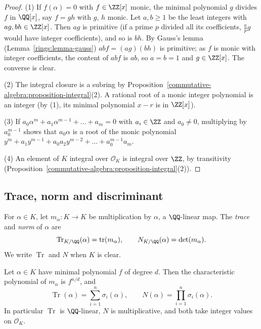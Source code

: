 \begin{proof}
(1) If $f(\alpha) = 0$ with $f \in \ZZ[x]$ monic, the minimal polynomial $g$ divides $f$ in $\QQ[x]$, say $f = gh$ with $g$, $h$ monic. Let $a, b \geq 1$ be the least integers with $ag, bh \in \ZZ[x]$. Then
$ag$ is primitive (if a prime $p$ divided all its coefficients, $\frac ap g$ would have integer coefficients), and so is $bh$. By Gauss's lemma (Lemma~\ref{rings:lemma-gauss}) $abf = (ag)(bh)$ is
primitive; as $f$ is monic with integer coefficients, the content of $abf$ is $ab$, so $a = b = 1$ and $g \in \ZZ[x]$. The converse is clear.

(2) The integral closure is a subring by Proposition~\ref{commutative-algebra:proposition-integral}(2). A rational root of a monic integer polynomial is an integer (by (1), its minimal polynomial
$x - r$ is in $\ZZ[x]$).

(3) If $a_0\alpha^m + a_1\alpha^{m-1} + \dots + a_m = 0$ with $a_i \in \ZZ$ and $a_0 \neq 0$, multiplying by $a_0^{m-1}$ shows that $a_0\alpha$ is a root of the monic polynomial
$y^m + a_1y^{m-1} + a_0a_2y^{m-2} + \dots + a_0^{m-1}a_m$.

(4) An element of $K$ integral over $\mathcal{O}_K$ is integral over $\ZZ$, by transitivity (Proposition~\ref{commutative-algebra:proposition-integral}(2)).
\end{proof}

\subsection{Trace, norm and discriminant}\label{algebraic-number-theory:subsection-trace-norm}

\begin{definition}\label{algebraic-number-theory:definition-trace-norm}
For $\alpha \in K$, let $m_\alpha \colon K \to K$ be multiplication by $\alpha$, a $\QQ$-linear map. The \emph{trace} and \emph{norm} of $\alpha$ are
\[
\operatorname{Tr}_{K/\QQ}(\alpha) = \operatorname{tr}(m_\alpha), \qquad N_{K/\QQ}(\alpha) = \det(m_\alpha).
\]
We write $\operatorname{Tr}$ and $N$ when $K$ is clear.
\end{definition}

\begin{proposition}\label{algebraic-number-theory:proposition-trace-norm}
Let $\alpha \in K$ have minimal polynomial $f$ of degree $d$. Then the characteristic polynomial of $m_\alpha$ is $f^{n/d}$, and
\[
\operatorname{Tr}(\alpha) = \sum_{i=1}^n\sigma_i(\alpha), \qquad N(\alpha) = \prod_{i=1}^n\sigma_i(\alpha).
\]
In particular $\operatorname{Tr}$ is $\QQ$-linear, $N$ is multiplicative, and both take integer values on $\mathcal{O}_K$.
\end{proposition}

